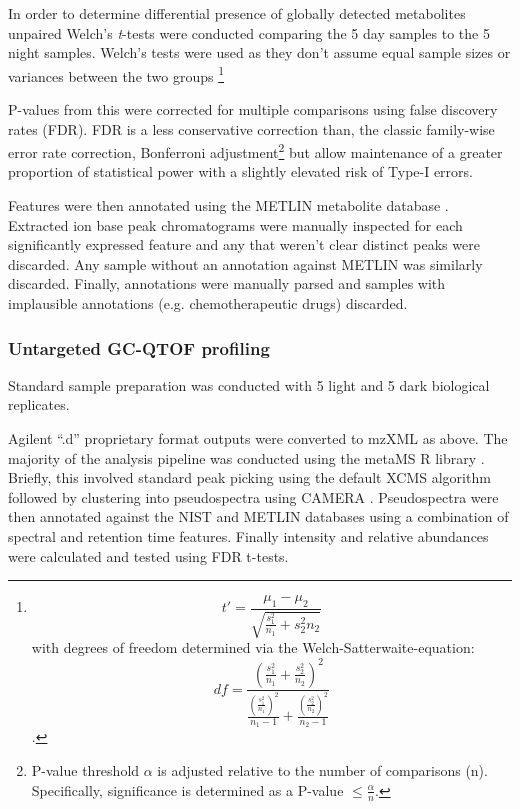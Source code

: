 In order to determine differential presence of globally detected metabolites
unpaired Welch's \textit{t}-tests were conducted comparing the 5 day samples to the 5
night samples. Welch's tests were used as they don't assume equal sample sizes or variances
between the two groups \citep{Welch1947}\footnote{
    \[t' = \frac{\mu_1 - \mu_2}{\sqrt{\frac{s^2_1}{n_1} + {s^2_2}{n_2}}}\]
    with degrees of freedom determined via the Welch-Satterwaite-equation:
    \[df = \frac{(\frac{s^2_1}{n_1} + \frac{s^2_2}{n_2})^2}{\frac{(\frac{s^2_1}{n_1})^2}{n_1 - 1} + \frac{(\frac{s^2_2}{n_2})^2}{n_2 - 1}}\]
    \citep{Ruxton2006}.
}

P-values from this were corrected 
for multiple comparisons using false discovery rates (FDR).  FDR is a
less conservative correction than, the classic family-wise error rate correction,
Bonferroni adjustment\footnote{
    P-value threshold \(\alpha\) is adjusted relative to the number of comparisons (n). 
Specifically, significance is determined as a P-value \(\leq \frac{\alpha}{n}\).} but
allow maintenance of a greater proportion of statistical power with a 
slightly elevated risk of Type-I errors. 

Features were then annotated using the METLIN metabolite database \citep{Smith2005a,Sana2008,Tautenhahn2012a}.
Extracted ion base peak chromatograms were manually inspected for each significantly expressed feature
and any that weren't clear distinct peaks were discarded. Any sample without
an annotation against METLIN was similarly discarded. Finally, annotations
were manually parsed and samples with implausible annotations (e.g. 
chemotherapeutic drugs) discarded.  

\subsubsection{Untargeted GC-QTOF profiling}

Standard sample preparation was conducted 
with 5 light and 5 dark biological replicates.  

Agilent ``.d'' proprietary format outputs were converted to mzXML as above.
The majority of the analysis pipeline was conducted using the metaMS R library
\citep{Wehrens2014}.  Briefly, this involved standard peak picking using the
default XCMS algorithm \citep{Smith2006} followed by clustering into
pseudospectra using CAMERA \citep{Kuhl2012}.  Pseudospectra were then annotated
against the NIST and METLIN databases using a combination of spectral
and retention time features.  Finally intensity and relative abundances
were calculated and tested using FDR t-tests.

